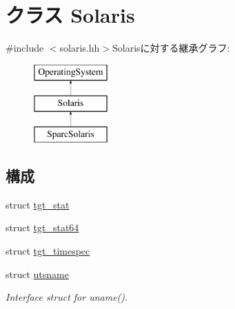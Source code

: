 \hypertarget{classSolaris}{
\section{クラス Solaris}
\label{classSolaris}
}


{\ttfamily \#include $<$solaris.hh$>$}Solarisに対する継承グラフ:\begin{figure}[H]
\begin{center}
\leavevmode
\includegraphics[height=3cm]{classSolaris}
\end{center}
\end{figure}
\subsection*{構成}
\begin{DoxyCompactItemize}
\item 
struct \hyperlink{structSolaris_1_1tgt__stat}{tgt\_\-stat}
\item 
struct \hyperlink{structSolaris_1_1tgt__stat64}{tgt\_\-stat64}
\item 
struct \hyperlink{structSolaris_1_1tgt__timespec}{tgt\_\-timespec}
\item 
struct \hyperlink{structSolaris_1_1utsname}{utsname}
\begin{DoxyCompactList}\small\item\em Interface struct for uname(). \item\end{DoxyCompactList}\end{DoxyCompactItemize}
